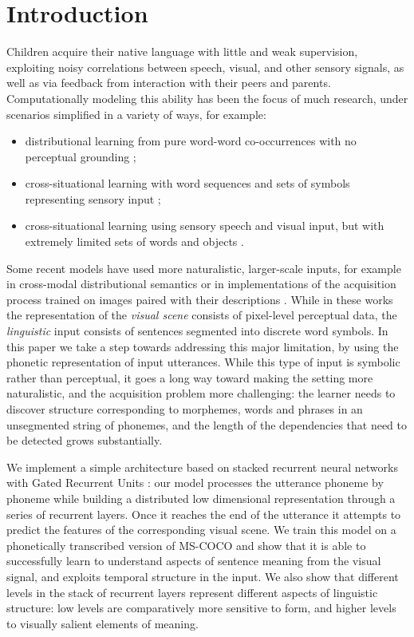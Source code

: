 \section{Introduction}
\label{sec:intro}

Children acquire their native language with little and weak
supervision, exploiting noisy correlations between speech, visual, and
other sensory signals, as well as via feedback from interaction with
their peers and parents. Computationally modeling this ability has
been the focus of much research, under scenarios simplified
in a variety of ways, for example:

\begin{itemize}
\item distributional learning from pure word-word co-occurrences with
  no perceptual grounding \cite{landauer1998introduction,kiros2015skip};
\item cross-situational learning with word sequences and sets of
  symbols representing sensory input
  \cite{siskind.96,fazly.etal.10csj};
\item cross-situational learning using sensory speech and visual
  input, but with extremely limited sets of words and objects
  \cite{Roy2002113,iwahashi2003language}.
\end{itemize}

Some recent models have used more naturalistic, larger-scale inputs,
for example in cross-modal distributional semantics
\cite{lazaridou2015combining} or in implementations of the acquisition
process trained on images paired with their descriptions
\cite{chrupala2015learning}. While in these works the representation
of the {\it visual scene} consists of pixel-level perceptual data, the
{\it linguistic} input consists of sentences segmented into discrete
word symbols. In this paper we take a step towards addressing this
major limitation, by using the phonetic representation of input
utterances. While this type of input is symbolic rather than
perceptual, it goes a long way toward making the setting more
naturalistic, and the acquisition problem more challenging: the
learner needs to discover structure corresponding to morphemes, words
and phrases in an unsegmented string of phonemes, and the length of
the dependencies that need to be detected grows substantially.

We implement a simple architecture based on stacked recurrent neural
networks with Gated Recurrent Units \cite{chung2014empirical}: our
model processes the utterance phoneme by phoneme while building a
distributed low dimensional representation through a series of
recurrent layers. Once it reaches the end of the utterance it attempts
to predict the features of the corresponding visual scene. We train
this model on a phonetically transcribed version of MS-COCO
\cite{lin2014microsoft} and show that it is able to successfully learn
to understand aspects of sentence meaning from the visual signal, and 
exploits temporal structure in the input. We also show that different
levels in the stack of recurrent layers represent different aspects of
linguistic structure: low levels are comparatively more sensitive to
form, and higher levels to visually salient elements of meaning.

